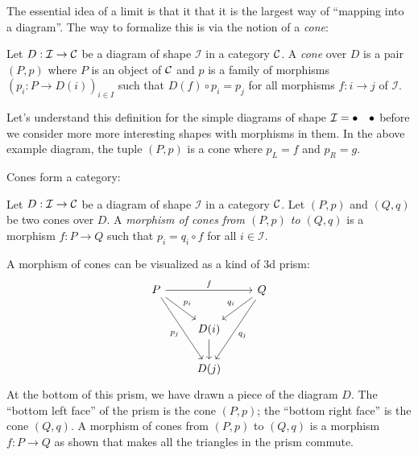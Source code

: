 The essential idea of a limit is that it that it is the largest way of ``mapping 
into a diagram''. 
The way to formalize this is via the notion of a \emph{cone}:

\begin{definition}[Cone]
  \sloppy
  Let \(D : \mathcal I \to \mathcal C\) be a diagram of shape \(\mathcal I\)
  in a category \(\mathcal C\).
  A \emph{cone} over \(D\) is a pair \((P,p)\)
  where \(P\) is an object of \(\mathcal C\)
  and \(p\) is a family of morphisms \((p_i : P \to D(i))_{i\in I}\)
  such that \(D(f) \circ p_i = p_j\) for all morphisms \(f : i \to j\)
  of \(\mathcal I\).
\end{definition}

Let's understand this definition for the simple diagrams of shape $\mathcal I =
\bullet \quad \bullet$ before we consider more more interesting shapes with
morphisms in them. In the above example diagram, the tuple $(P, p)$
is a cone where $p_L = f$ and $p_R = g$.


Cones form a category:
\begin{definition}
  Let \(D : \mathcal I \to \mathcal C\) be a diagram of shape \(\mathcal I\)
  in a category \(\mathcal C\).
  Let \((P,p)\) and \((Q,q)\) be two cones over \(D\).
  A \emph{morphism of cones from \((P,p)\) to \((Q,q)\)}
  is a morphism \(f : P \to Q\) such that \(p_i = q_i \circ f\)
  for all \(i \in \mathcal I\).
\end{definition}
A morphism of cones can be visualized as a kind of 3d prism:
\[%
\begin{tikzcd}
P \arrow[rr, "f"] \arrow[rd, "p_i"] \arrow[rdd, "p_j"'] &                & Q \arrow[ld, "q_i"'] \arrow[ldd, "q_j"] \\
                                                        & D(i) \arrow[d] &                                         \\
                                                        & D(j)           &
\end{tikzcd}\]
At the bottom of this prism, we have drawn a piece of the diagram \(D\).
The ``bottom left face'' of the prism is the cone \((P,p)\); the ``bottom right face'' is the cone \((Q,q)\).
A morphism of cones from \((P,p)\) to \((Q,q)\) is a morphism \(f : P \to Q\) as shown
that makes all the triangles in the prism commute.

